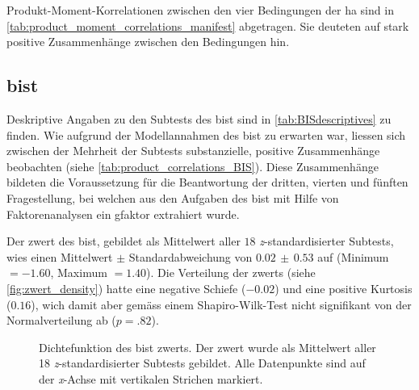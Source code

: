 \documentclass[11pt, twoside, a4paper]{book}		%
\begin{document}
Produkt-Moment-Korrelationen zwischen den vier Bedingungen der \gls{ha} sind in \autoref{tab:product_moment_correlations_manifest} abgetragen. Sie deuteten auf stark positive Zusam\-men\-hänge zwischen den Bedingungen hin.
















\subsection{\gls{bist}}

Deskriptive Angaben zu den Subtests des \gls{bist} sind in \autoref{tab:BISdescriptives} zu finden.
Wie aufgrund der Modellannahmen des \gls{bist} zu erwarten war, liessen sich zwischen der Mehrheit der Subtests substanzielle, positive Zusammenhänge beobachten (siehe \autoref{tab:product_correlations_BIS}). Diese Zusammenhänge bildeten die Voraussetzung für die Beantwortung der dritten, vierten und fünften Fragestellung, bei welchen aus den Aufgaben des \gls{bist} mit Hilfe von Faktorenanalysen ein \gls{gfaktor} extrahiert wurde.

Der \gls{zwert} des \gls{bist}, gebildet als Mittelwert aller $18$ \textit{z}-stand\-ard\-isier\-ter Subtests, wies einen Mittelwert $\pm$ Standardabweichung von $0.02\,\pm\,0.53$ auf (Minimum $= -1.60$, Maximum $= 1.40$). Die Verteilung der \gls{zwert}s (siehe \autoref{fig:zwert_density}) hatte eine negative Schiefe ($-0.02$) und eine positive Kurtosis ($0.16$), wich damit aber gemäss einem Shapiro-Wilk-Test  nicht signifikant von der Normalverteilung ab ($p=.82$).



\begin{figure}[htbp]
	\centering
	\begin{adjustbox}{width=1\textwidth}
		
	\end{adjustbox}
	\caption[Dichtefunktion des \gls{bist} \gls{zwert}]{Dichtefunktion des \gls{bist} \gls{zwert}s. Der \gls{zwert} wurde als Mittelwert aller 18 \textit{z}-standardisierter Subtests gebildet. Alle Datenpunkte sind auf der \textit{x}-Achse mit vertikalen Strichen markiert.}
	\label{fig:zwert_density}
\end{figure}
\end{document}
